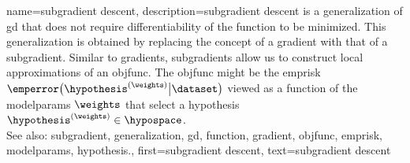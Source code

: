 {name={subgradient descent}, 
	description={\Gls{subgradient} 
		descent is a \gls{generalization} of \gls{gd} that does not require differentiability of the 
		\gls{function} to be minimized. This generalization is obtained by replacing the concept 
		of a \gls{gradient} with that of a \gls{subgradient}. Similar to \glspl{gradient}, \glspl{subgradient} 
		allow us to construct local approximations of an \gls{objfunc}. The \gls{objfunc} 
		might be the \gls{emprisk} $\emperror\big( \hypothesis^{(\weights)} \big| \dataset \big)$ viewed 
		as a \gls{function} of the \glspl{modelparam} $\weights$ that select a \gls{hypothesis} $\hypothesis^{(\weights)} \in \hypospace$.
				\\
		See also: \gls{subgradient}, \gls{generalization}, \gls{gd}, \gls{function}, \gls{gradient}, \gls{objfunc}, \gls{emprisk}, \glspl{modelparam}, \gls{hypothesis}.},
	first={subgradient descent},
	text={subgradient descent} 
}
	
